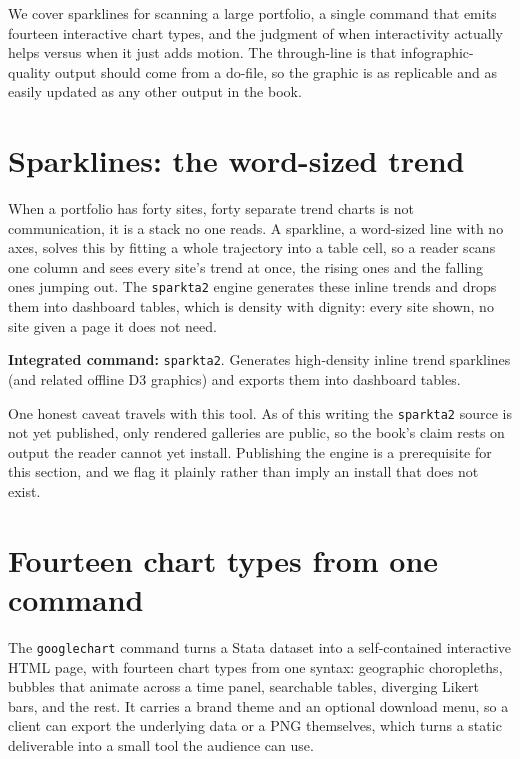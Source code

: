 \documentclass[
    a4paper,
    fontsize=10pt,
    twoside=true,
    numbers=noenddot,
]{kaobook}
\begin{document}
We cover sparklines for scanning a large portfolio, a single command that emits fourteen interactive chart types, and the judgment of when interactivity actually helps versus when it just adds motion. The through-line is that infographic-quality output should come from a do-file, so the graphic is as replicable and as easily updated as any other output in the book.

\section{Sparklines: the word-sized trend}
When a portfolio has forty sites, forty separate trend charts is not communication, it is a stack no one reads. A sparkline, a word-sized line with no axes, solves this by fitting a whole trajectory into a table cell, so a reader scans one column and sees every site's trend at once, the rising ones and the falling ones jumping out. The \texttt{sparkta2} engine generates these inline trends and drops them into dashboard tables, which is density with dignity: every site shown, no site given a page it does not need.

\begin{kaobox}[frametitle=Package Integration: \texttt{sparkta2}]
\textbf{Integrated command:} \texttt{sparkta2}. Generates high-density inline trend sparklines (and related offline D3 graphics) and exports them into dashboard tables. %
\end{kaobox}

One honest caveat travels with this tool. As of this writing the \texttt{sparkta2} source is not yet published, only rendered galleries are public, so the book's claim rests on output the reader cannot yet install. Publishing the engine is a prerequisite for this section, and we flag it plainly rather than imply an install that does not exist.

\section{Fourteen chart types from one command}
The \texttt{googlechart} command turns a Stata dataset into a self-contained interactive HTML page, with fourteen chart types from one syntax: geographic choropleths, bubbles that animate across a time panel, searchable tables, diverging Likert bars, and the rest. It carries a brand theme and an optional download menu, so a client can export the underlying data or a PNG themselves, which turns a static deliverable into a small tool the audience can use.
\end{document}
